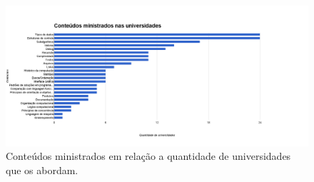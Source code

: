 \begin{figure}
  \begin{center}
    \includegraphics[scale=0.43]{img/universidades}
  \end{center}
  \caption{Conteúdos ministrados em relação a quantidade de universidades que os abordam. }
  \label{fig:conteudos}
\end{figure}

